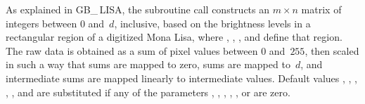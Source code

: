 As explained in {\sc GB\_\,LISA}, the subroutine call
 constructs an $m\times n$
matrix of integers between $0$ and~$d$, inclusive, based on the brightness
levels in a rectangular region of a digitized Mona Lisa, where ,
, , and  define that region. The raw data is
obtained as a
sum of  pixel values between $0$
and~$255$, then
scaled in such a way that sums  are mapped to zero, sums 
are mapped to~$d$, and intermediate sums are mapped linearly to
intermediate values. Default values , , ,
, , and  are substituted if any
of the parameters , , , , , or %
 are zero.

